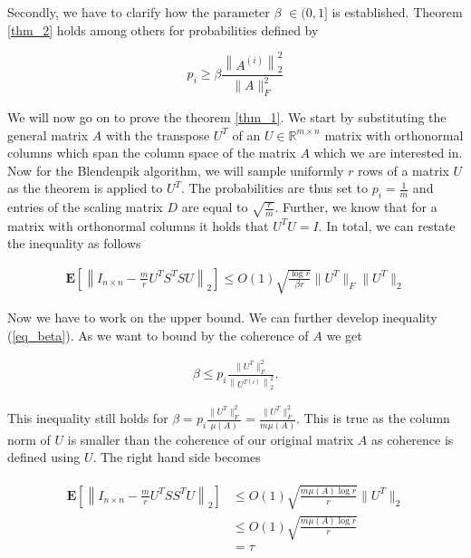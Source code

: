 \documentclass{article}
\begin{document}
\smallskip

Secondly, we have to clarify how the parameter $\beta$ $\in (0,1]$ is
established. Theorem \ref{thm_2} holds among others for probabilities defined by

\begin{equation} \label{eq_beta}
	p_i \geq \beta \frac{\left\|A^{(i)}\right\|^2_2}{\|A\|_{F}^2}
\end{equation}

\smallskip

We will now go on to prove the theorem \ref{thm_1}. We start by substituting
the general matrix $A$ with the transpose $U^T$ of an $U \in \mathbb{R}^{m
\times n}$ matrix with orthonormal columns which span the column space of the
matrix $A$ which we are interested in. Now for the Blendenpik algorithm, we
will sample uniformly $r$ rows of a matrix $U$ as the theorem is applied to
$U^T$. The probabilities are thus set to $p_i= \frac{1}{m}$ and entries of the
scaling matrix $D$ are equal to $\sqrt{\frac{r}{m}}$. Further, we know that for
a matrix with orthonormal columns it holds that $U^TU=I$. In total, we can
restate the inequality as follows 

\begin{align*}
	\mathbf{E}\left[\left\|I_{n \times n}-\frac{m}{r}U^TS^T SU\right\|_2\right]
	\leq O(1) \sqrt{\frac{\log r}{\beta r}}\|U^T\|_{F}\|U^T\|_{2}
\end{align*}

Now we have to work on the upper bound. We can further develop inequality
(\ref{eq_beta}). As we want to bound by the coherence of $A$ we get

\begin{align*}
	\beta \leq p_i \frac{\|U^T\|_{F}^2}{\left\|U^{T{(i)}}\right\|^2_2} .
\end{align*}

This inequality still holds for $\beta = p_i \frac{\|U^T\|_{F}^2}{\mu(A)} =
\frac{\|U^T\|_{F}^2}{m \mu(A)} $. This is true as the column norm of $U$ is
smaller than the coherence of our original matrix $A$ as coherence is defined
using $U$. The right hand side becomes

\begin{align*}
	\begin{aligned}
		\mathbf{E}\left[\left\|I_{n \times n}-\frac{m}{r}U^TS S^TU\right\|_2\right]
		&\leq O(1) \sqrt{\frac{m \mu(A) \log r}{r}}\|U^T\|_{2} \\
		&\leq O(1) \sqrt{\frac{m \mu(A) \log r}{r}} \\
		&= \tau
	\end{aligned}
\end{align*}
\end{document}
